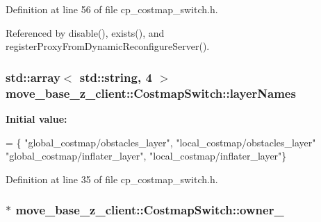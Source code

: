 Definition at line 56 of file cp\+\_\+costmap\+\_\+switch.\+h.



Referenced by disable(), exists(), and register\+Proxy\+From\+Dynamic\+Reconfigure\+Server().

\subsubsection[{\texorpdfstring{layer\+Names}{layerNames}}]{\setlength{\rightskip}{0pt plus 5cm}std\+::array$<$ std\+::string, 4 $>$ move\+\_\+base\+\_\+z\+\_\+client\+::\+Costmap\+Switch\+::layer\+Names\hspace{0.3cm}{\ttfamily [static]}}\hypertarget{classmove__base__z__client_1_1CostmapSwitch_adf295965004c939144db60ef353ad89e}{}\label{classmove__base__z__client_1_1CostmapSwitch_adf295965004c939144db60ef353ad89e}
{\bfseries Initial value\+:}
\begin{DoxyCode}
=
        \{
            \textcolor{stringliteral}{"global\_costmap/obstacles\_layer"},
            \textcolor{stringliteral}{"local\_costmap/obstacles\_layer"}
            \textcolor{stringliteral}{"global\_costmap/inflater\_layer"},
            \textcolor{stringliteral}{"local\_costmap/inflater\_layer"}\}
\end{DoxyCode}


Definition at line 35 of file cp\+\_\+costmap\+\_\+switch.\+h.

\subsubsection[{\texorpdfstring{owner\+\_\+}{owner_}}]{$\ast$ move\+\_\+base\+\_\+z\+\_\+client\+::\+Costmap\+Switch\+::owner\+\_\+\hspace{0.3cm}{\ttfamily [private]}}\hypertarget{classmove__base__z__client_1_1CostmapSwitch_a00517c28045327007d7b9335c9b433ed}{}\label{classmove__base__z__client_1_1CostmapSwitch_a00517c28045327007d7b9335c9b433ed}


